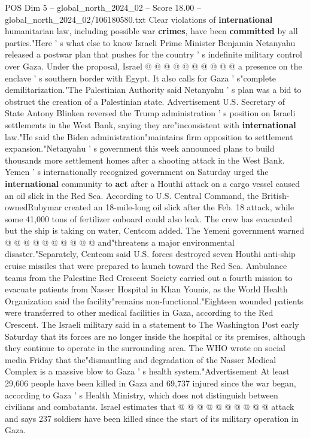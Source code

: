 \begin{textsample}{POS Dim 5 – global\_north\_2024\_02 – Score 18.00 – global\_north\_2024\_02/106180580.txt}
Clear violations of \textbf{international} humanitarian law, including possible war \textbf{crimes}, have been \textbf{committed} by all parties."Here ' s what else to know Israeli Prime Minister Benjamin Netanyahu released a postwar plan that pushes for the country ' s indefinite military control over Gaza.
Under the proposal, Israel @ @ @ @ @ @ @ @ @ @ a presence on the enclave ' s southern border with Egypt.
It also calls for Gaza ' s"complete demilitarization."The Palestinian Authority said Netanyahu ' s plan was a bid to obstruct the creation of a Palestinian state.
Advertisement U.S.
Secretary of State Antony Blinken reversed the Trump administration ' s position on Israeli settlements in the West Bank, saying they are"inconsistent with \textbf{international} law."He said the Biden administration"maintains firm opposition to settlement expansion."Netanyahu ' s government this week announced plans to build thousands more settlement homes after a shooting attack in the West Bank.
Yemen ' s internationally recognized government on Saturday urged the \textbf{international} community to \textbf{act} after a Houthi attack on a cargo vessel caused an oil slick in the Red Sea.
According to U.S.
Central Command, the British-ownedRubymar created an 18-mile-long oil slick after the Feb. 18 attack, while some 41,000 tons of fertilizer onboard could also leak.
The crew has evacuated but the ship is taking on water, Centcom added.
The Yemeni government warned @ @ @ @ @ @ @ @ @ @ and"threatens a major environmental disaster."Separately, Centcom said U.S. forces destroyed seven Houthi anti-ship cruise missiles that were prepared to launch toward the Red Sea.
Ambulance teams from the Palestine Red Crescent Society carried out a fourth mission to evacuate patients from Nasser Hospital in Khan Younis, as the World Health Organization said the facility"remains non-functional."Eighteen wounded patients were transferred to other medical facilities in Gaza, according to the Red Crescent.
The Israeli military said in a statement to The Washington Post early Saturday that its forces are no longer inside the hospital or its premises, although they continue to operate in the surrounding area.
The WHO wrote on social media Friday that the"dismantling and degradation of the Nasser Medical Complex is a massive blow to Gaza ' s health system."Advertisement At least 29,606 people have been killed in Gaza and 69,737 injured since the war began, according to Gaza ' s Health Ministry, which does not distinguish between civilians and combatants.
Israel estimates that @ @ @ @ @ @ @ @ @ @ attack and says 237 soldiers have been killed since the start of its military operation in Gaza.

\end{textsample}
